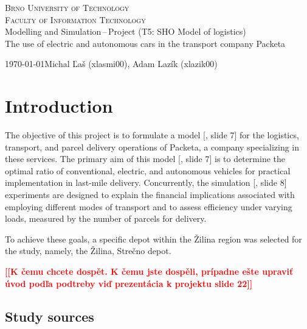 \documentclass[a4paper, 11pt, a4paper]{article}
\newcommand{\todo}[1]{\textcolor{red}{\textbf{[[#1]]}}}
\begin{document}
\begin{titlepage}
    \begin{center}
            \textsc{\Huge Brno University of Technology \\}
            \vspace{0.5em}
            \textsc{\huge Faculty of Information Technology \\}
            {\LARGE 	Modelling and Simulation\,--\,Project (T5: SHO Model of logistics) \\ 
            \vspace{0.4em}
            \Huge The use of electric and autonomous cars in the transport company Packeta}
    \end{center}
    {\Large \today \hfill Michal Ľaš (xlasmi00), Adam Lazík (xlazik00)}
\end{titlepage}

\tableofcontents
\newpage

\section{Introduction}

The objective of this project is to formulate a model [\cite{IMS.lectures}, slide 7] for the logistics, transport, and parcel delivery operations of Packeta, 
a company specializing in these services. The primary aim of this model [\cite{IMS.lectures}, slide 7] is to determine the optimal ratio of conventional, electric, 
and autonomous vehicles for practical implementation in last-mile delivery. Concurrently, the simulation [\cite{IMS.lectures}, slide 8] experiments are designed to 
explain the financial implications associated with employing different modes of transport and to assess efficiency under varying loads, 
measured by the number of parcels for delivery.

To achieve these goals, a specific depot within the Žilina region was selected for the study, namely, the Žilina, Strečno depot.

\noindent\todo{K čemu chcete dospět. K čemu jste dospěli, prípadne ešte upraviť úvod podľa podtreby viď prezentácia k projektu slide 22}


\subsection{Study sources}
\end{document}
